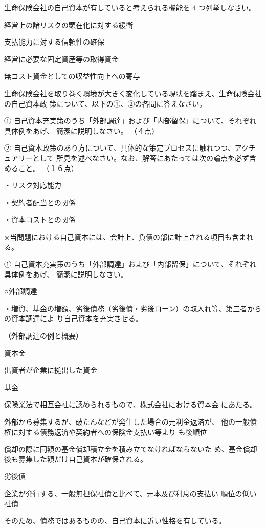\documentclass[report,gutter=10mm,fore-edge=10mm,uplatex,dvipdfmx]{jlreq}
\begin{document}
生命保険会社の自己資本が有していると考えられる機能を 4 つ列挙しなさい。

\answer{}
経営上の諸リスクの顕在化に対する緩衝

支払能力に対する信頼性の確保

経営に必要な固定資産等の取得資金

無コスト資金としての収益性向上への寄与

生命保険会社を取り巻く環境が大きく変化している現状を踏まえ、生命保険会社の自己資本政
策について、以下の①、②の各問に答えなさい。

① 自己資本充実策のうち「外部調達」および「内部留保」について、それぞれ具体例をあげ、
簡潔に説明しなさい。
（４点）


② 自己資本政策のあり方について、具体的な策定プロセスに触れつつ、アクチュアリーとして
所見を述べなさい。なお、解答にあたっては次の論点を必ず含めること。
（１６点）

・リスク対応能力

・契約者配当との関係

・資本コストとの関係

※当問題における自己資本には、会計上、負債の部に計上される項目も含まれる。

\answer{}
① 自己資本充実策のうち「外部調達」および「内部留保」について、それぞれ具体例をあげ、
簡潔に説明しなさい。

○外部調達

・増資、基金の増額、劣後債務（劣後債・劣後ローン）の取入れ等、第三者からの資本調達によ
り自己資本を充実させる。

（外部調達の例と概要）

資本金

出資者が企業に拠出した資金

基金

保険業法で相互会社に認められるもので、株式会社における資本金
にあたる。

外部から募集するが、破たんなどが発生した場合の元利金返済が、
他の一般債権に対する債務返済や契約者への保険金支払い等より
も後順位

償却の際に同額の基金償却積立金を積み立てなければならないた
め、基金償却後も募集した額だけ自己資本が確保される。

劣後債

企業が発行する、一般無担保社債と比べて、元本及び利息の支払い
順位の低い社債

そのため、債務ではあるものの、自己資本に近い性格を有している。
\end{document}
